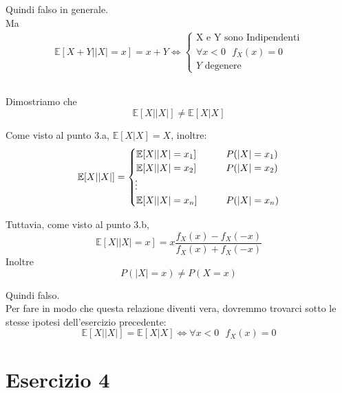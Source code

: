 \documentclass[a4paper]{article}
\newcommand{\E}[0]{\mathbb{E}}
\begin{document}
Quindi falso in generale. \\
Ma 
\begin{align*}
\E[X + Y | |X| = x] = x + Y \iff
	\begin{cases}
        \text{X e Y sono Indipendenti} \\
        \forall x < 0  \ \ \  f_X(x) = 0 \\
        Y \text{ degenere}
	\end{cases}
\end{align*}


\subsection{}
Dimostriamo che 
$$
\E[X||X|] \ne \E[X | X] 
$$

Come visto al punto 3.a,  $\E[X | X] = X$, inoltre:
\begin{align}
	\E[X | |X|]=
	\begin{cases}
		\E[X | |X| = x_1] \qquad & P(|X|=x_1)\\
		\E[X | |X| = x_2] \qquad & P(|X|=x_2)\\
        \vdotswithin{} \notag \\
		\E[X | |X| = x_n] \qquad & P(|X|=x_n)\\
	\end{cases}
\end{align}

Tuttavia, come visto al punto 3.b, 
$$\E[X | |X| = x] = x\frac{f_X(x)-f_X(-x)}{f_X(x) + f_X(-x)}$$
Inoltre
$$P(|X| = x) \ne P(X = x)$$

Quindi falso. \\ 
Per fare in modo che questa relazione diventi vera, dovremmo trovarci sotto le stesse ipotesi dell'esercizio precedente:
$$
\E[X||X|] = \E[X | X] \iff \forall x<0 \ \ \ f_X(x) = 0
$$

\section{Esercizio 4}
\end{document}
